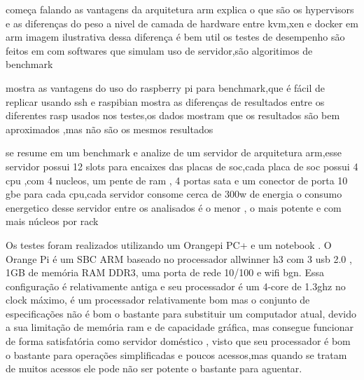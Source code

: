 \documentclass[
	12pt,				%
	openright,			%
	oneside,			%
	a4paper,			%
	english,			%
	french,				%
	spanish,			%
	brazil,				%
	]{abntex2}
\begin{document}
começa falando as vantagens da arquitetura arm
explica o que são os hypervisors e as diferenças do peso a nivel de camada de hardware entre kvm,xen e docker em arm
imagem ilustrativa dessa diferença é bem util
os testes de desempenho são feitos em com softwares que simulam uso de servidor,são algoritimos de benchmark

mostra as vantagens do uso do raspberry pi para benchmark,que é fácil de replicar usando ssh e raspibian
mostra as diferenças de resultados entre os diferentes rasp usados nos testes,os dados mostram que os resultados são bem aproximados ,mas não são os mesmos resultados

se resume em um benchmark e analize de um servidor de arquitetura arm,esse servidor possui 12 slots para encaixes das placas de soc,cada placa de soc possui 4 cpu ,com 4 nucleos, um pente de ram , 4 portas sata e um conector de porta 10 gbe para cada cpu,cada servidor consome cerca de 300w de energia
o consumo energetico desse servidor entre os analisados é o menor , o mais potente e com mais núcleos por rack

Os testes foram realizados utilizando um Orangepi PC+ e um notebook .
O Orange Pi é um SBC ARM baseado no processador allwinner h3 com 3 usb 2.0 , 1GB de memória RAM DDR3, uma porta de rede 10/100 e wifi bgn. Essa configuração é relativamente antiga e seu processador é um 4-core de 1.3ghz no clock máximo,
é um processador relativamente bom mas o conjunto de especificações não é bom o bastante para substituir um computador atual,
devido a sua limitação de memória ram e de capacidade gráfica, mas consegue funcionar de forma satisfatória como servidor doméstico ,
visto que seu processador é bom o bastante para operações simplificadas e poucos acessos,mas quando se tratam de muitos acessos ele pode não ser potente o bastante para aguentar.
\end{document}
